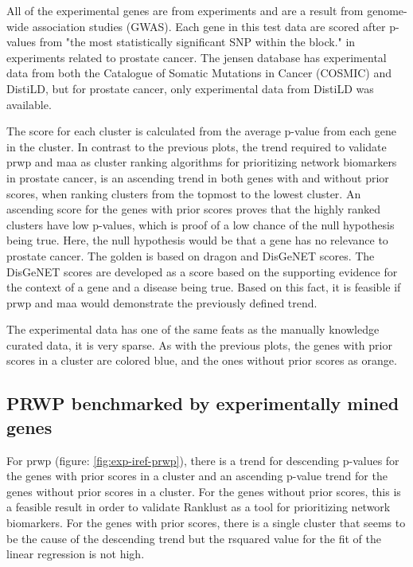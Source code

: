 All of the experimental genes are from experiments and are a result from
genome-wide association studies (GWAS). Each gene in this test data are scored
after p-values from "the most statistically significant SNP within the
block."\cite{distild} in experiments related to prostate cancer. The
\gls{jensen} database has experimental data from both the Catalogue of Somatic
Mutations in Cancer (COSMIC) and DistiLD, but for prostate cancer, only
experimental data from DistiLD was available.

The score for each cluster is calculated from the average p-value from each gene
in the cluster. In contrast to the previous plots, the trend required to
validate \gls{prwp} and \gls{maa} as cluster ranking algorithms for prioritizing
network biomarkers in prostate cancer, is an ascending trend in both genes with
and without prior scores, when ranking clusters from the topmost to the lowest
cluster. An ascending score for the genes with prior scores proves that the
highly ranked clusters have low p-values, which is proof of a low chance of the
null hypothesis being true. Here, the null hypothesis would be that a gene has
no relevance to prostate cancer. The \gls{golden} is based on \gls{dragon} and
DisGeNET scores. The DisGeNET scores are developed as a score based on the
supporting evidence for the context of a gene and a disease being
true\cite{disgenet}. Based on this fact, it is feasible if \gls{prwp} and
\gls{maa} would demonstrate the previously defined trend.

The experimental data has one of the same feats as the manually knowledge
curated data, it is very sparse. As with the previous plots, the genes with
prior scores in a cluster are colored blue, and the ones without prior scores as
orange.

\subsection{PRWP benchmarked by experimentally mined genes}
For \gls{prwp} (figure: \ref{fig:exp-iref-prwp}), there is a trend for descending
p-values for the genes with prior scores in a cluster and an ascending p-value
trend for the genes without prior scores in a cluster. For the genes without
prior scores, this is a feasible result in order to validate Ranklust as a tool
for prioritizing network biomarkers. For the genes with prior scores, there is
a single cluster that seems to be the cause of the descending trend but the
\gls{rsquared} value for the fit of the linear regression is not high.

